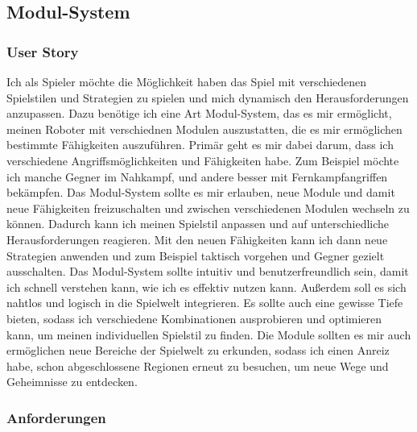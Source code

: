 \subsection{Modul-System}  %

\subsubsection{User Story}
Ich als Spieler möchte die Möglichkeit haben das Spiel mit verschiedenen Spielstilen und Strategien zu spielen und mich dynamisch den Herausforderungen anzupassen. Dazu benötige ich eine Art Modul-System, das es mir ermöglicht, meinen Roboter mit verschiednen Modulen auszustatten, die es mir ermöglichen bestimmte Fähigkeiten auszuführen. Primär geht es mir dabei darum, dass ich verschiedene Angriffsmöglichkeiten und Fähigkeiten habe. Zum Beispiel möchte ich manche Gegner im Nahkampf, und andere besser mit Fernkampfangriffen bekämpfen. Das Modul-System sollte es mir erlauben, neue Module und damit neue Fähigkeiten freizuschalten und zwischen verschiedenen Modulen wechseln zu können. Dadurch kann ich meinen Spielstil anpassen und auf unterschiedliche Herausforderungen reagieren. Mit den neuen Fähigkeiten kann ich dann neue Strategien anwenden und zum Beispiel taktisch vorgehen und Gegner gezielt ausschalten. Das Modul-System sollte intuitiv und benutzerfreundlich sein, damit ich schnell verstehen kann, wie ich es effektiv nutzen kann. Außerdem soll es sich nahtlos und logisch in die Spielwelt integrieren. Es sollte auch eine gewisse Tiefe bieten, sodass ich verschiedene Kombinationen ausprobieren und optimieren kann, um meinen individuellen Spielstil zu finden. Die Module sollten es mir auch ermöglichen neue Bereiche der Spielwelt zu erkunden, sodass ich einen Anreiz habe, schon abgeschlossene Regionen erneut zu besuchen, um neue Wege und Geheimnisse zu entdecken. 

\subsubsection{Anforderungen}

